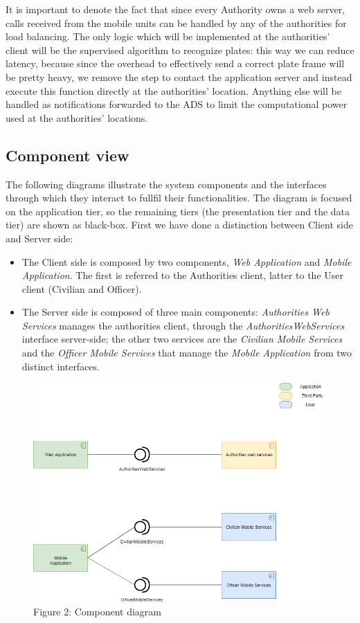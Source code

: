 \documentclass[12pt,a4paper]{article}
\begin{document}
It is important to denote the fact that since every Authority owns a web server, calls received from the mobile units can be handled by any of the authorities for load balancing. The only logic which will be implemented at the authorities' client will be the supervised algorithm to recognize plates: this way
we can reduce latency, because since the overhead to effectively send a correct plate frame will be pretty heavy, we remove the step to contact the application server and instead execute this function directly at the authorities' location. Anything else will be handled as notifications forwarded to the ADS
to limit the computational power used at the authorities' locations.


\subsection{Component view}
The following diagrams illustrate the system components and the interfaces through which they interact to fullfil their functionalities. The diagram is focused on the application tier, so the remaining tiers (the presentation tier and the data tier) are shown as black-box.
First we have done a distinction between Client side and Server side:
\begin{itemize}
\item The Client side is composed by two components, \textit{Web Application} and \textit{Mobile Application}. The first is referred to the Authorities client, latter to the User client (Civilian and Officer).
\item The Server side is composed of three main components: \textit{Authorities Web Services} manages the authorities client, through the \textit{AuthoritiesWebServices} interface server-side; the other two services are the \textit{Civilian Mobile Services} and the \textit{Officer Mobile Services} that manage  the \textit{Mobile Application} from two distinct interfaces.
\end{itemize}
\begin{figure}[H]
		\centering
			\includegraphics[width=1.0\linewidth]{Images/ComponentDiagram}
		\caption{Figure 2: Component diagram}
\end{figure}
\end{document}
